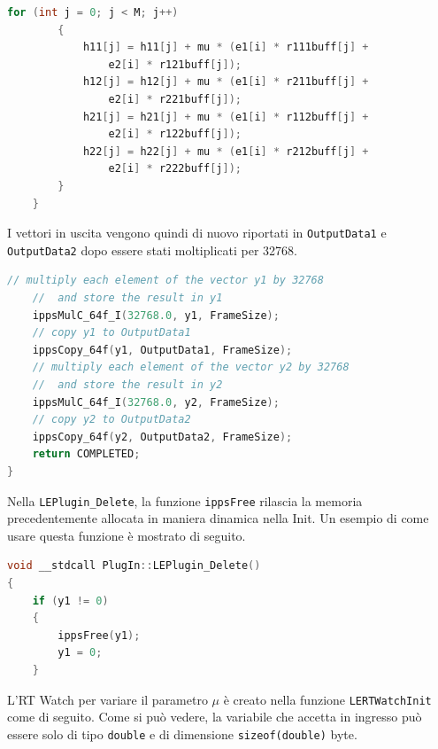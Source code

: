 \documentclass[12pt,a4paper,titlepage]{article}
\begin{document}
\begin{lstlisting}[language=cpp, label=code:agg, caption = Aggiornamento dei filtri h, breaklines = false, captionpos = b]
		for (int j = 0; j < M; j++)
		{
			h11[j] = h11[j] + mu * (e1[i] * r111buff[j] + 
				e2[i] * r121buff[j]);
			h12[j] = h12[j] + mu * (e1[i] * r211buff[j] + 
				e2[i] * r221buff[j]);
			h21[j] = h21[j] + mu * (e1[i] * r112buff[j] + 
				e2[i] * r122buff[j]);
			h22[j] = h22[j] + mu * (e1[i] * r212buff[j] + 
				e2[i] * r222buff[j]);
		}	
	}
\end{lstlisting}
I vettori in uscita vengono quindi di nuovo riportati in \texttt{OutputData1} e \texttt{OutputData2} dopo essere stati moltiplicati per 32768.
\begin{lstlisting}[language=cpp, label=code:output, caption = Aggiornamento delle uscite e scaling, breaklines = false, captionpos = b]
	// multiply each element of the vector y1 by 32768 
	//	and store the result in y1
	ippsMulC_64f_I(32768.0, y1, FrameSize);
	// copy y1 to OutputData1
	ippsCopy_64f(y1, OutputData1, FrameSize);
	// multiply each element of the vector y2 by 32768 
	//	and store the result in y2
	ippsMulC_64f_I(32768.0, y2, FrameSize);
	// copy y2 to OutputData2
	ippsCopy_64f(y2, OutputData2, FrameSize);
	return COMPLETED;
}
\end{lstlisting}
Nella \texttt{LEPlugin\_Delete}, la funzione \texttt{ippsFree} rilascia la memoria precedentemente allocata in maniera dinamica nella Init. Un esempio di come usare questa funzione è mostrato di seguito.
\begin{lstlisting}[language=cpp, label=code:delete_lms, caption = Delete, breaklines = false, captionpos = b]
void __stdcall PlugIn::LEPlugin_Delete()
{
	if (y1 != 0)
	{
		ippsFree(y1);
		y1 = 0;
	}
\end{lstlisting}
L'RT Watch per variare il parametro $\mu$ è creato nella funzione \texttt{LERTWatchInit} come di seguito. Come si può vedere, la variabile che accetta in ingresso può essere solo di tipo \texttt{double} e di dimensione \texttt{sizeof(double)} byte.
\end{document}
